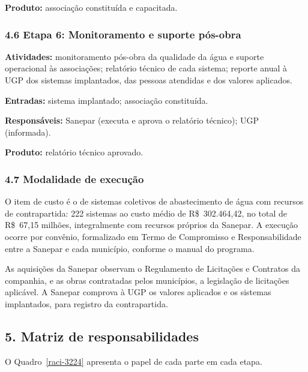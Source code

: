 \textbf{Produto:} associação constituída e capacitada.

\subsubsection*{4.6 Etapa 6: Monitoramento e suporte pós-obra}

\textbf{Atividades:} monitoramento pós-obra da qualidade da água e suporte operacional às associações; relatório técnico de cada sistema; reporte anual à UGP dos sistemas implantados, das pessoas atendidas e dos valores aplicados.

\textbf{Entradas:} sistema implantado; associação constituída.

\textbf{Responsáveis:} Sanepar (executa e aprova o relatório técnico); UGP (informada).

\textbf{Produto:} relatório técnico aprovado.

\subsubsection*{4.7 Modalidade de execução}

O item de custo é o de sistemas coletivos de abastecimento de água com recursos de contrapartida: 222 sistemas ao custo médio de R\$~302.464,42, no total de R\$~67,15 milhões, integralmente com recursos próprios da Sanepar. A execução ocorre por convênio, formalizado em Termo de Compromisso e Responsabilidade entre a Sanepar e cada município, conforme o manual do programa.

As aquisições da Sanepar observam o Regulamento de Licitações e Contratos da companhia, e as obras contratadas pelos municípios, a legislação de licitações aplicável. A Sanepar comprova à UGP os valores aplicados e os sistemas implantados, para registro da contrapartida.


{}
\subsection*{5. Matriz de responsabilidades}

O Quadro~\ref{raci-3224} apresenta o papel de cada parte em cada etapa.


